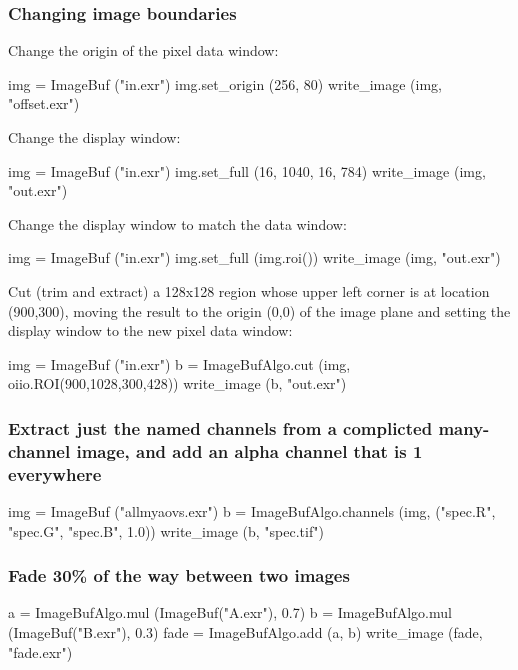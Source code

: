 \subsubsection*{Changing image boundaries}

\noindent Change the origin of the pixel data window:
\begin{code}
    img = ImageBuf ("in.exr")
    img.set_origin (256, 80)
    write_image (img, "offset.exr")
\end{code}

\noindent Change the display window:
\begin{code}
    img = ImageBuf ("in.exr")
    img.set_full (16, 1040, 16, 784)
    write_image (img, "out.exr")
\end{code}

\noindent Change the display window to match the data window:
\begin{code}
    img = ImageBuf ("in.exr")
    img.set_full (img.roi())
    write_image (img, "out.exr")
\end{code}

\noindent Cut (trim and extract) a 128x128 region whose upper left corner
is at location (900,300), moving the result to the origin (0,0) of the image
plane and setting the display window to the new pixel data window:
\begin{code}
    img = ImageBuf ("in.exr")
    b = ImageBufAlgo.cut (img, oiio.ROI(900,1028,300,428))
    write_image (b, "out.exr")
\end{code}


\subsubsection*{Extract just the named channels from a complicted many-channel
image, and add an alpha channel that is 1 everywhere}
\begin{code}
    img = ImageBuf ("allmyaovs.exr")
    b = ImageBufAlgo.channels (img, ("spec.R", "spec.G", "spec.B", 1.0))
    write_image (b, "spec.tif")
\end{code}


\subsubsection*{Fade 30\% of the way between two images}

\begin{code}
    a = ImageBufAlgo.mul (ImageBuf("A.exr"), 0.7)
    b = ImageBufAlgo.mul (ImageBuf("B.exr"), 0.3)
    fade = ImageBufAlgo.add (a, b)
    write_image (fade, "fade.exr")
\end{code}



